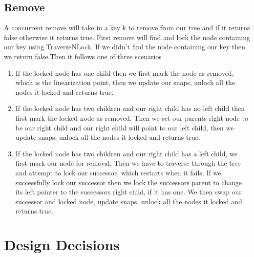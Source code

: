 \documentclass[conference]{IEEEtran}
\begin{document}
\subsection{Remove}
A concurrent remove will take in a key k to remove from our tree and if it returns false otherwise it returns true. First remove will find and lock the node containing our key using TraverseNLock. If we didn't find the node containing our key then we return false.Then it follows one of three scenarios
\begin{enumerate}
\item If the locked node has one child then we first mark the node as removed, which is the linearization point, then we update our snaps, unlock all the nodes it locked and returns true.
\item If the locked node has two children and our right child has no left child then first mark the locked node as removed. Then we set our parents right node to be our right child and our right child will point to our left child, then we update snaps, unlock all the nodes it locked and returns true.
\item If the locked node has two children and our right child has a left child, we first mark our node for removal. Then we have to traverse through the tree and attempt to lock our successor, which restarts when it fails. If we successfully lock our successor then we lock the successors parent to change its left pointer to the successors right child, if it has one. We then swap our successor and locked node, update snaps, unlock all the nodes it locked and returns true.
\end{enumerate}  
\section{Design Decisions}




\end{document}
